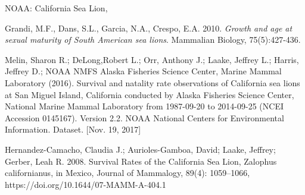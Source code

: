 \documentclass[12pt, a4paper]{article}
\begin{document}
\begin{thebibliography}{99}

NOAA: California Sea Lion, \\

Grandi, M.F., Dans, S.L., Garcia, N.A., Crespo, E.A. 2010. \emph{Growth and age at sexual maturity of South American sea lions}. Mammalian Biology, 75(5):427-436.   

Melin, Sharon R.; DeLong,Robert L.; Orr, Anthony J.; Laake, Jeffrey L.; Harris, Jeffrey D.; NOAA NMFS Alaska Fisheries Science Center, Marine Mammal Laboratory (2016). Survival and natality rate observations of California sea lions at San Miguel Island, California conducted by Alaska Fisheries Science Center, National Marine Mammal Laboratory from 1987-09-20 to 2014-09-25 (NCEI Accession 0145167). Version 2.2. NOAA National Centers for Environmental Information. Dataset. [Nov. 19, 2017]

Hernandez-Camacho, Claudia J.; Aurioles-Gamboa, David; Laake, Jeffrey; Gerber, Leah R. 2008. Survival Rates of the California Sea Lion, Zalophus californianus, in Mexico, Journal of Mammalogy, 89(4): 1059–1066, https://doi.org/10.1644/07-MAMM-A-404.1


\end{thebibliography}
\end{document}
